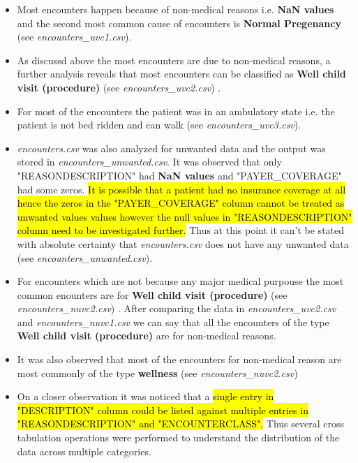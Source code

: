 \documentclass[12pt, twosided]{report}  %
\begin{document}
\begin{itemize}
	\item Most encounters happen because of non-medical reasons i.e. \textbf{NaN values} and the second most common cause of encounters is \textbf{Normal Pregenancy} (see \textit{encounters\_uvc1.csv}).
	
	\item As discussd above the most encounters are due to non-medical reasons, a further analysis reveals that most encounters can be classified as \textbf{Well child visit (procedure)} (see \textit{encounters\_uvc2.csv}) .
	
	\item For most of the encounters the patient was in an ambulatory state i.e. the patient is not bed ridden and can walk (see \textit{encounters\_uvc3.csv}).
	
	
	\item \textit{encounters.csv} was also analyzed for unwanted data and the output was stored in \textit{encounters\_unwanted.csv}. It was observed that only "REASONDESCRIPTION" had \textbf{NaN values} and "PAYER\_COVERAGE" had some zeros. \hl{It is possible that a patient had no insurance coverage at all hence the zeros in the "PAYER\_COVERAGE" column cannot be treated as unwanted values values however the null values in "REASONDESCRIPTION"  column need to be investigated further.} Thus at this point it can't be stated with absolute certainty that \textit{encounters.csv} does not have any unwanted data (see \textit{encounters\_unwanted.csv}). 
	
	\item For encounters which are not because any major medical purpouse the most common enounters are for  \textbf{Well child visit (procedure)} (see \textit{encounters\_nuvc2.csv}) . After comparing the data in \textit{encounters\_uvc2.csv} and \textit{encounters\_nuvc1.csv} we can say that all the encounters of the type \textbf{Well child visit (procedure)} are for non-medical reasons.
	
	\item It was also observed that most of the encounters for non-medical reason are most commonly of the type \textbf{wellness} (see \textit{encounters\_nuvc2.csv})
	
	\item On a closer observation it was noticed that a \hl{single entry in "DESCRIPTION" column could be listed against multiple entries in "REASONDESCRIPTION" and "ENCOUNTERCLASS".} Thus several cross tabulation operations were performed to understand the distribution of the data across multiple categories.
	

\end{itemize}
\end{document}
